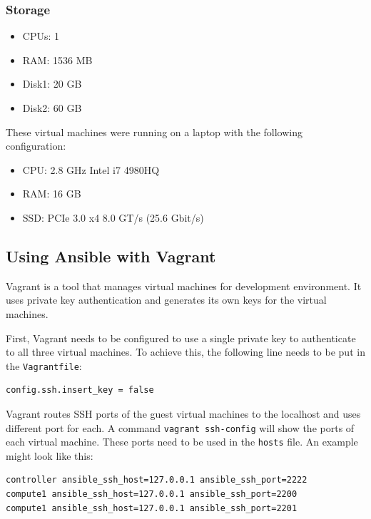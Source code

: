 \subsubsection*{Storage}

\begin{itemize}
  \item{CPUs: 1}
  \item{RAM: 1536 MB}
  \item{Disk1: 20 GB}
  \item{Disk2: 60 GB}
\end{itemize}

These virtual machines were running on a laptop with the following configuration:

\begin{itemize}
  \item{CPU: 2.8 GHz Intel i7 4980HQ}
  \item{RAM: 16 GB}
  \item{SSD: PCIe 3.0 x4 8.0 GT/s (25.6 Gbit/s)}
\end{itemize}

\subsection{Using Ansible with Vagrant}

Vagrant is a tool that manages virtual machines for development environment. It uses private key authentication and generates its own keys for the virtual machines.

First, Vagrant needs to be configured to use a single private key to authenticate to all three virtual machines. To achieve this, the following line needs to be put in the \texttt{Vagrantfile}:


\begin{lstlisting}
config.ssh.insert_key = false
\end{lstlisting}



Vagrant routes SSH ports of the guest virtual machines to the localhost and uses different port for each. A command \texttt{vagrant ssh-config} will show the ports of each virtual machine. These ports need to be used in the \texttt{hosts} file. An example might look like this:

\begin{lstlisting}
controller ansible_ssh_host=127.0.0.1 ansible_ssh_port=2222
compute1 ansible_ssh_host=127.0.0.1 ansible_ssh_port=2200
compute1 ansible_ssh_host=127.0.0.1 ansible_ssh_port=2201
\end{lstlisting}

